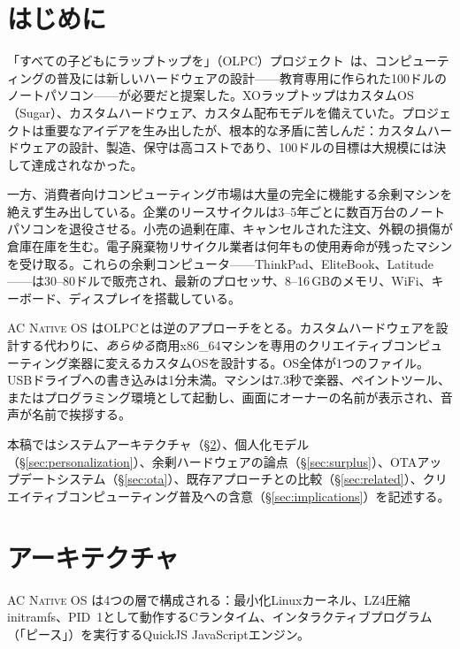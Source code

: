 \documentclass[10pt,letterpaper,twocolumn]{article}
\newcommand{\acos}{\textsc{AC Native OS}}
\begin{document}

\section{はじめに}

「すべての子どもにラップトップを」（OLPC）プロジェクト~\citep{negroponte1995being, kraemer2009olpc}は、コンピューティングの普及には新しいハードウェアの設計——教育専用に作られた100ドルのノートパソコン——が必要だと提案した。XOラップトップはカスタムOS（Sugar）、カスタムハードウェア、カスタム配布モデルを備えていた。プロジェクトは重要なアイデアを生み出したが、根本的な矛盾に苦しんだ：カスタムハードウェアの設計、製造、保守は高コストであり、100ドルの目標は大規模には決して達成されなかった。

一方、消費者向けコンピューティング市場は大量の完全に機能する余剰マシンを絶えず生み出している。企業のリースサイクルは3--5年ごとに数百万台のノートパソコンを退役させる。小売の過剰在庫、キャンセルされた注文、外観の損傷が倉庫在庫を生む。電子廃棄物リサイクル業者は何年もの使用寿命が残ったマシンを受け取る。これらの余剰コンピュータ——ThinkPad、EliteBook、Latitude——は30--80ドルで販売され、最新のプロセッサ、8--16\,GBのメモリ、WiFi、キーボード、ディスプレイを搭載している。

\acos{} はOLPCとは逆のアプローチをとる。カスタムハードウェアを設計する代わりに、\emph{あらゆる}商用x86\_64マシンを専用のクリエイティブコンピューティング楽器に変えるカスタムOSを設計する。OS全体が1つのファイル。USBドライブへの書き込みは1分未満。マシンは7.3秒で楽器、ペイントツール、またはプログラミング環境として起動し、画面にオーナーの名前が表示され、音声が名前で挨拶する。

本稿ではシステムアーキテクチャ（\S\ref{sec:architecture}）、個人化モデル（\S\ref{sec:personalization}）、余剰ハードウェアの論点（\S\ref{sec:surplus}）、OTAアップデートシステム（\S\ref{sec:ota}）、既存アプローチとの比較（\S\ref{sec:related}）、クリエイティブコンピューティング普及への含意（\S\ref{sec:implications}）を記述する。


\section{アーキテクチャ}
\label{sec:architecture}

\acos{} は4つの層で構成される：最小化Linuxカーネル、LZ4圧縮initramfs、PID~1として動作するCランタイム、インタラクティブプログラム（「ピース」）を実行するQuickJS JavaScriptエンジン。
\end{document}

